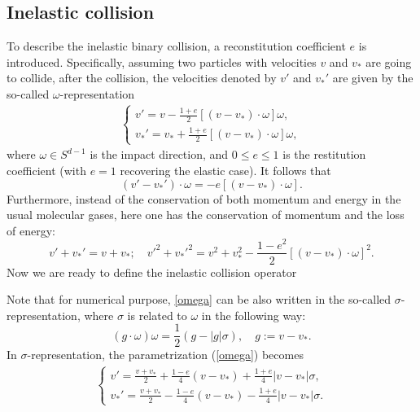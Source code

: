 \documentclass[review, times]{elsarticle}
\begin{document}
\subsection{Inelastic collision }
To describe the inelastic binary collision, a reconstitution coefficient $e$ is introduced. Specifically, assuming two particles with velocities $v$ and $v_*$ are going to collide, after the collision, the velocities denoted by $v'$ and $v_*'$ are given by the so-called $\omega$-representation \cite{vilani} 
\begin{align}\label{omega}
\left\{
\begin{array}{l}
\displaystyle v'=v-\frac{1+e}{2}[(v-v_*)\cdot \omega ]\omega, \\[8pt]
\displaystyle v_*'=v_*+\frac{1+e}{2}[(v-v_*)\cdot \omega]\omega,
\end{array}\right.
\end{align}
where $\omega \in S^{d-1}$ is the impact direction, and $0 \leq e \leq 1$ is the restitution coefficient (with $e=1$ recovering the elastic case). It follows that
\begin{equation}
(v'-v_*')\cdot \omega=-e [(v-v_*)\cdot \omega].
\end{equation}
Furthermore, instead of the conservation of both momentum and energy in the usual molecular gases, here one has the conservation of momentum and the loss of energy:
\begin{equation} \label{lossenergy}
v'+v_*'=v+v_*; \quad v'^2+v_*'^2=v^2+v_*^2-\frac{1-e^2}{2}[(v-v_*)\cdot \omega]^2.
\end{equation}
Now we are ready to define the inelastic collision operator


Note that for numerical purpose, \eqref{omega} can be also written in the so-called $\sigma$-representation, where $\sigma$ is related to $\omega$ in the following way:
\begin{equation} \label{relation}
(g\cdot \omega)\omega =\frac{1}{2}(g-|g|\sigma), \quad g:=v-v_*.
\end{equation}
In $\sigma$-representation, the parametrization (\ref{omega}) becomes
\begin{align*} 
\left\{
\begin{array}{l}
\displaystyle v'=\frac{v+v_*}{2}+\frac{1-e}{4}(v-v_*)+\frac{1+e}{4}|v-v_*|\sigma, \\[8pt]
\displaystyle v_*'=\frac{v+v_*}{2}- \frac{1-e}{4}(v-v_*)-\frac{1+e}{4}|v-v_*|\sigma.
\end{array}\right.
\end{align*}
\end{document}
